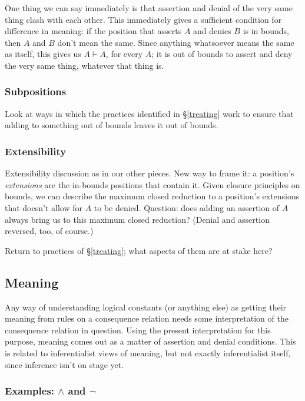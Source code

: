 \documentclass{article}
\newcommand{\cns}{\vdash}
\begin{document}
One thing we can say immediately is that assertion and denial of the very same thing clash with each other. 
This immediately gives a sufficient condition for difference in meaning: if the position that asserts $A$ and denies $B$ is in bounds, then $A$ and $B$ don't mean the same.
Since anything whatsoever means the same as itself, this gives us $A \cns A$, for every $A$; it is out of bounds to assert and deny the very same thing, whatever that thing is.


\subsubsection{Subpositions} \label{weakening}

Look at ways in which the practices identified in \S\ref{treating} work to ensure that adding to something out of bounds leaves it out of bounds.

\subsubsection{Extensibility} \label{cut}

Extensibility discussion as in our other pieces.
New way to frame it: a position's {\em extensions} are the in-bounds positions that contain it. 
Given closure principles on bounds, we can describe the maximum closed reduction to a position's extensions that doesn't allow for $A$ to be denied.
Question: does adding an assertion of $A$ always bring us to this maximum closed reduction?
(Denial and assertion reversed, too, of course.)

Return to practices of \S\ref{treating}; what aspects of them are at stake here?

\subsection{Meaning} \label{meaning}

Any way of understanding logical constants (or anything else) as getting their meaning from rules on a consequence relation needs some interpretation of the consequence relation in question.
Using the present interpretation for this purpose, meaning comes out as a matter of assertion and denial conditions.
This is related to inferentialist views of meaning, but not exactly inferentialist itself, since inference isn't on stage yet.

\subsubsection{Examples: $\wedge$ and $\neg$} \label{operational}
\end{document}
